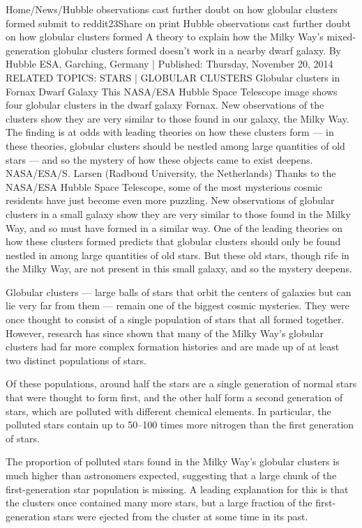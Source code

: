 Home/News/Hubble observations cast further doubt on how globular clusters formed
submit to reddit23Share on print
Hubble observations cast further doubt on how globular clusters formed
A theory to explain how the Milky Way’s mixed-generation globular clusters formed doesn’t work in a nearby dwarf galaxy.
By Hubble ESA, Garching, Germany  |  Published: Thursday, November 20, 2014
RELATED TOPICS: STARS | GLOBULAR CLUSTERS
Globular clusters in Fornax Dwarf Galaxy
This NASA/ESA Hubble Space Telescope image shows four globular clusters in the dwarf galaxy Fornax. New observations of the clusters show they are very similar to those found in our galaxy, the Milky Way. The finding is at odds with leading theories on how these clusters form — in these theories, globular clusters should be nestled among large quantities of old stars — and so the mystery of how these objects came to exist deepens.
NASA/ESA/S. Larsen (Radboud University, the Netherlands)
Thanks to the NASA/ESA Hubble Space Telescope, some of the most mysterious cosmic residents have just become even more puzzling. New observations of globular clusters in a small galaxy show they are very similar to those found in the Milky Way, and so must have formed in a similar way. One of the leading theories on how these clusters formed predicts that globular clusters should only be found nestled in among large quantities of old stars. But these old stars, though rife in the Milky Way, are not present in this small galaxy, and so the mystery deepens.
 
Globular clusters — large balls of stars that orbit the centers of galaxies but can lie very far from them — remain one of the biggest cosmic mysteries. They were once thought to consist of a single population of stars that all formed together. However, research has since shown that many of the Milky Way's globular clusters had far more complex formation histories and are made up of at least two distinct populations of stars.
 
Of these populations, around half the stars are a single generation of normal stars that were thought to form first, and the other half form a second generation of stars, which are polluted with different chemical elements. In particular, the polluted stars contain up to 50–100 times more nitrogen than the first generation of stars.

The proportion of polluted stars found in the Milky Way's globular clusters is much higher than astronomers expected, suggesting that a large chunk of the first-generation star population is missing. A leading explanation for this is that the clusters once contained many more stars, but a large fraction of the first-generation stars were ejected from the cluster at some time in its past.

